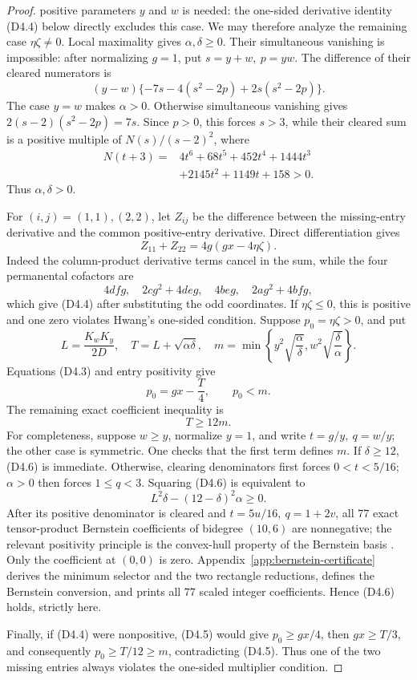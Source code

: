 \documentclass[11pt]{amsart}
\theoremstyle{definition}
\theoremstyle{remark}
\begin{document}
\begin{proof}
positive parameters \(y\) and \(w\) is needed: the one-sided derivative
identity (D4.4) below directly excludes this case.  We may therefore analyze
the remaining case \(\eta\zeta\ne0\).  Local maximality gives
\(\alpha,\delta\geq0\).  Their simultaneous vanishing is impossible:
after normalizing \(g=1\), put \(s=y+w,\ p=yw\).  The difference of their
cleared numerators is
\[
(y-w)\{-7s-4(s^2-2p)+2s(s^2-2p)\}.
\]
The case \(y=w\) makes \(\alpha>0\).  Otherwise simultaneous vanishing gives
\(2(s-2)(s^2-2p)=7s\).  Since \(p>0\), this forces \(s>3\), while their
cleared sum is a positive multiple of \(N(s)/(s-2)^2\), where
\[
\begin{split}
N(t+3)={}&4t^6+68t^5+452t^4+1444t^3\\
&+2145t^2+1149t+158>0.
\end{split}
\]
Thus \(\alpha,\delta>0\).

For \((i,j)=(1,1),(2,2)\), let \(Z_{ij}\) be the difference between the
missing-entry derivative and the common positive-entry derivative.  Direct differentiation gives
\[
Z_{11}+Z_{22}=4g(gx-4\eta\zeta).                  \tag{D4.4}
\]
Indeed the column-product derivative terms cancel in the sum, while the
four permanental cofactors are
\[
4dfg,\quad 2cg^2+4deg,\quad 4beg,\quad 2ag^2+4bfg,
\]
which give (D4.4) after substituting the odd coordinates.
If \(\eta\zeta\leq0\), this is positive and one zero violates Hwang's
one-sided condition.  Suppose \(p_0=\eta\zeta>0\), and put
\[
L=\frac{K_wK_y}{2D},\quad T=L+\sqrt{\alpha\delta},\quad
m=\min\left\{y^2\sqrt{\frac\alpha\delta},
w^2\sqrt{\frac\delta\alpha}\right\}.
\]
Equations (D4.3) and entry positivity give
\[
p_0=gx-\frac T4,\qquad p_0<m.                     \tag{D4.5}
\]
The remaining exact coefficient inequality is
\[
T\geq12m.                                         \tag{D4.6}
\]
For completeness, suppose \(w\geq y\), normalize \(y=1\), and write
\(t=g/y,\ q=w/y\); the other case is symmetric.  One checks that the first
term defines \(m\).  If \(\delta\geq12\), (D4.6) is immediate.  Otherwise,
clearing denominators first forces \(0<t<5/16\); \(\alpha>0\) then forces
\(1\leq q<3\).  Squaring (D4.6) is equivalent to
\[
L^2\delta-(12-\delta)^2\alpha\geq0.               \tag{D4.7}
\]
After its positive denominator is cleared and
\(t=5u/16,\ q=1+2v\), all \(77\) exact tensor-product Bernstein
coefficients of bidegree \((10,6)\) are nonnegative; the relevant positivity
principle is the convex-hull property of the Bernstein basis
\cite{Farouki}.  Only the coefficient
at \((0,0)\) is zero.  Appendix~\ref{app:bernstein-certificate}
derives the minimum selector and the two rectangle reductions, defines the
Bernstein conversion, and prints all \(77\) scaled integer coefficients.
Hence (D4.6) holds, strictly here.

Finally, if (D4.4) were nonpositive, (D4.5) would give
\(p_0\geq gx/4\), then \(gx\geq T/3\), and consequently
\(p_0\geq T/12\geq m\), contradicting (D4.5).  Thus one of the two missing
entries always violates the one-sided multiplier condition.
\end{proof}
\end{document}
